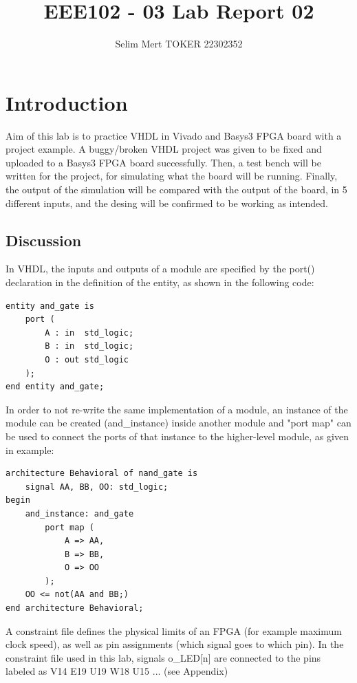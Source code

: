 \documentclass[a4paper, 12pt]{article}
\title{\Large EEE102 - 03 \qquad Lab Report 02\\ \small \hrulefill}
\date{}
\author{Selim Mert TOKER 22302352}
\begin{document}
\maketitle
\vspace{-2cm}
\section{Introduction}

Aim of this lab is to practice VHDL in Vivado and Basys3 FPGA board with a project example.
A buggy/broken VHDL project was given to be fixed and uploaded to a Basys3 FPGA board successfully.
Then, a test bench will be written for the project, for simulating what the board will be running.
Finally, the output of the simulation will be compared with the output of the board, in 5 different inputs, and the desing will be confirmed to be working as intended.

\subsection{Discussion}

In VHDL, the inputs and outputs of a module are specified by the port() declaration in the definition of the entity, as shown in the following code:

\begin{lstlisting}
entity and_gate is
    port (
        A : in  std_logic;
        B : in  std_logic;
        O : out std_logic
    );
end entity and_gate;
\end{lstlisting}

In order to not re-write the same implementation of a module, an instance of the module can be created (and\_instance) inside another module and "port map" can be used to connect the ports of that instance to the higher-level module, as given in example:

\begin{lstlisting}
architecture Behavioral of nand_gate is
    signal AA, BB, OO: std_logic;
begin
    and_instance: and_gate
        port map (
            A => AA,
            B => BB,
            O => OO
        );
    OO <= not(AA and BB;)
end architecture Behavioral;
\end{lstlisting}

A constraint file defines the physical limits of an FPGA (for example maximum clock speed), as well as pin assignments (which signal goes to which pin). In the constraint file used in this lab, signals o\_LED[n] are connected to the pins labeled as V14 E19 U19 W18 U15 ... (see Appendix)
\end{document}
